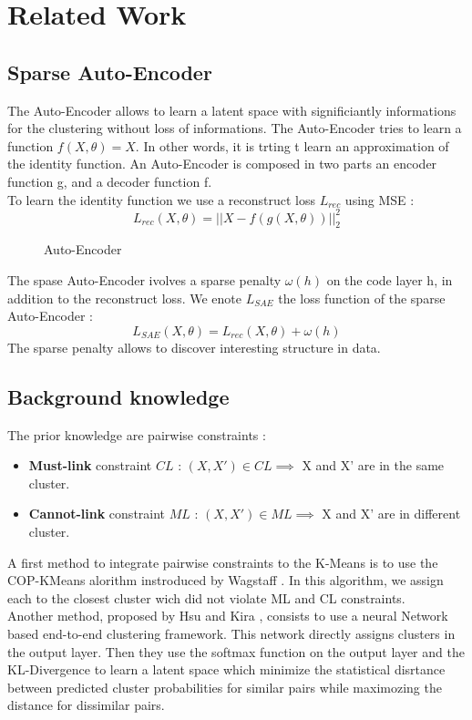 \section{Related Work}\label{sec:related}

\subsection{Sparse Auto-Encoder}

The Auto-Encoder allows to learn a latent space with significiantly informations
for the clustering without loss of informations. The Auto-Encoder tries to learn
a function $f(X, \theta) = X$. In other words, it is trting t learn an
approximation of the identity function. An Auto-Encoder is composed in two
parts an encoder function g, and a decoder function f.\\
To learn the identity function we use a reconstruct loss $L_{rec}$ using MSE :
\begin{equation*}
  L_{rec}(X, \theta) = || X - f(g(X, \theta)) ||_2^2 
\end{equation*}

\begin{figure}[!h]
  \centering
  
  \caption{Auto-Encoder}
  \label{fig:AE}
\end{figure}
The spase Auto-Encoder ivolves a sparse penalty $\omega(h)$ on the code layer h,
in addition to the reconstruct loss. We  enote $L_{SAE}$ the loss function of
the sparse Auto-Encoder :
\begin{equation*}
  L_{SAE}(X, \theta) = L_{rec}(X, \theta) + \omega(h)
\end{equation*}
The sparse penalty allows to discover interesting structure in data.

\subsection{Background knowledge}

The prior knowledge are pairwise constraints :
\begin{itemize}
\item \textbf{Must-link} constraint $CL$ : $(X, X') \in CL \implies $ X and X' are in the
  same cluster.
\item \textbf{Cannot-link} constraint $ML$ : $(X, X') \in ML \implies $ X and X' are in
  different cluster.
\end{itemize}
A first method to integrate pairwise constraints to the K-Means is to use the
COP-KMeans alorithm instroduced by Wagstaff
\cite{Wagstaff:2001:CKC:645530.655669}. In this algorithm, we assign each to the
closest cluster wich did not violate ML and CL constraints.
\\Another method, proposed by Hsu and Kira \cite{2015arXiv151106321H}, consists to
use a neural Network based end-to-end clustering framework. This network
directly assigns clusters in the output layer. Then they use the softmax function
on the output layer and the KL-Divergence to learn a latent space which minimize
the statistical disrtance between predicted cluster probabilities for similar
pairs while maximozing the distance for dissimilar pairs.
